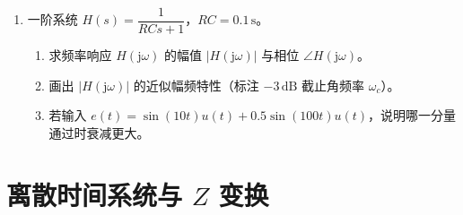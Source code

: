 \documentclass[11pt,a4paper]{ctexart}
\newcommand{\jj}{\mathrm{j}}
\begin{document}
\begin{enumerate}[label=\textbf{题\arabic*.},leftmargin=*,itemsep=1.2em,start=12]
\item \label{q:15}
一阶系统 $H(s)=\dfrac{1}{RCs+1}$，$RC=0.1\,\mathrm{s}$。
\begin{enumerate}[label=(\alph*)]
    \item 求频率响应 $H(\jj\omega)$ 的幅值 $|H(\jj\omega)|$ 与相位 $\angle H(\jj\omega)$。
    \item 画出 $|H(\jj\omega)|$ 的近似幅频特性（标注 $-3\,\mathrm{dB}$ 截止角频率 $\omega_c$）。
    \item 若输入 $e(t)=\sin(10t)u(t)+0.5\sin(100t)u(t)$，说明哪一分量通过时衰减更大。
\end{enumerate}

\end{enumerate}

\section{离散时间系统与 $Z$ 变换}
\end{document}
